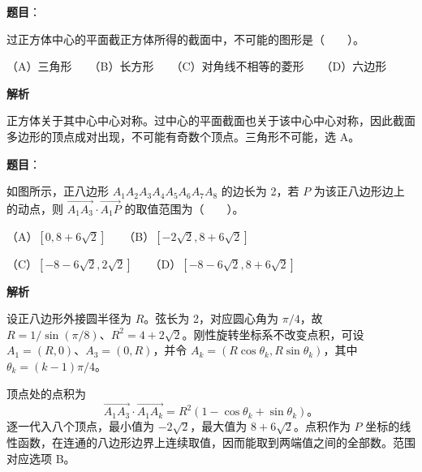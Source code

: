 \begin{answer}

\textbf{题目}：

过正方体中心的平面截正方体所得的截面中，不可能的图形是\mbox{（　　）}。

（A）三角形　　（B）长方形　　（C）对角线不相等的菱形　　（D）六边形

\textbf{解析}

正方体关于其中心中心对称。过中心的平面截面也关于该中心中心对称，因此截面多边形的顶点成对出现，不可能有奇数个顶点。三角形不可能，选 A。


\end{answer}
\begin{answer}

\textbf{题目}：

如图所示，正八边形 $A_1A_2A_3A_4A_5A_6A_7A_8$ 的边长为 2，若 $P$ 为该正八边形边上的动点，则 $\overrightarrow{A_1A_3}\cdot\overrightarrow{A_1P}$ 的取值范围为\mbox{（　　）}。
\nopagebreak[4]
\begin{center}\end{center}
\nopagebreak[4]
（A）$[0,8+6\sqrt2]$　　（B）$[-2\sqrt2,8+6\sqrt2]$

（C）$[-8-6\sqrt2,2\sqrt2]$　　（D）$[-8-6\sqrt2,8+6\sqrt2]$

\textbf{解析}

设正八边形外接圆半径为 $R$。弦长为 2，对应圆心角为 $\pi/4$，故 $R=1/\sin(\pi/8)$、$R^2=4+2\sqrt2$。刚性旋转坐标系不改变点积，可设 $A_1=(R,0)$、$A_3=(0,R)$，并令 $A_k=(R\cos\theta_k,R\sin\theta_k)$，其中 $\theta_k=(k-1)\pi/4$。

顶点处的点积为
\nopagebreak[4]
\[
\overrightarrow{A_1A_3}\cdot\overrightarrow{A_1A_k}
=R^2(1-\cos\theta_k+\sin\theta_k)\text{。}
\]
逐一代入八个顶点，最小值为 $-2\sqrt2$，最大值为 $8+6\sqrt2$。点积作为 $P$ 坐标的线性函数，在连通的八边形边界上连续取值，因而能取到两端值之间的全部数。范围对应选项 B。


\end{answer}
